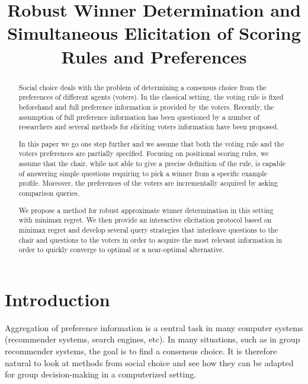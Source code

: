 \newcommand{\profile}{\bm{v}}%
\newcommand{\pprofile}{\bm{p}}%
\newcommand{\w}{\bm{w}}%
\newcommand{\C}{\mathcal{C}}%
\newcommand{\powersetz}[1]{\mathscr{P}^*(#1)}

\DeclareMathOperator{\Regret}{Regret}
\DeclareMathOperator{\SCORE}{Score}
\DeclareMathOperator{\PMR}{PMR}
\DeclareMathOperator{\MR}{MR}
\DeclareMathOperator{\MMR}{MMR}

\newtheorem{claim}{Claim}
\newtheorem{prop}{Proposition}
\newtheorem{corollary}{Corollary}
\newtheorem{definition}{Definition}
\newtheorem{example}{Example}

\DeclarePairedDelimiter\set{\{}{\}}

\title{Robust Winner Determination and Simultaneous Elicitation of Scoring Rules and Preferences}


\maketitle
\begin{abstract}
Social choice deals with the problem of determining a consensus choice from the preferences of different agents (voters).
In the classical setting, the voting rule is fixed beforehand and full preference information is provided by the voters. 
Recently, the assumption of full preference information has been questioned by a number of researchers and several methods for eliciting voters information have been proposed.

In this paper we go one step further and we assume that both the voting rule and the voters preferences are partially specified.
Focusing on positional scoring rules, we assume that the chair, while  not able to give a precise definition of the rule, is capable of answering simple questions  requiring to pick a winner from a specific  example profile.
Moreover, the preferences of the voters are incrementally acquired by asking comparison queries.

We propose a method  for robust approximate winner determination in this setting with minimax regret. 
We then provide an interactive elicitation protocol based on minimax regret
and develop several query strategies that interleave questions to the chair and questions to the voters in order to acquire the most relevant information in order to quickly converge to optimal or a near-optimal alternative.
\end{abstract}

\section{Introduction}
Aggregation of preference information is a central task in many computer systems (recommender systems, search engines, etc).
In many situations, such as in group recommender systems, the goal is to find a consensus choice.
It is therefore natural to look at methods from social choice and see how they can be adapted for group decision-making in a computerized setting.

